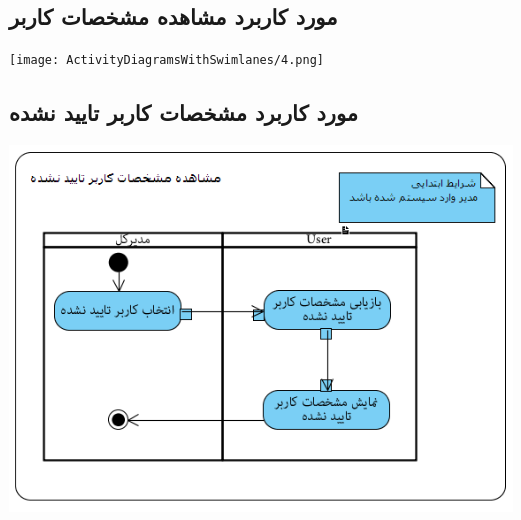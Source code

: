 \newpage
\vspace{2cm}
\subsection*{مورد کاربرد مشاهده مشخصات کاربر}
\vspace{2cm}
\begin{center}
\texttt{[image: ActivityDiagramsWithSwimlanes/4.png]}
\end{center}

\newpage
\vspace{2cm}
\subsection*{مورد کاربرد مشخصات کاربر تایید نشده}
\vspace{2cm}
\begin{center}
\includegraphics[width=\textwidth]{ActivityDiagramsWithSwimlanes/5.png}
\end{center}

\newpage
\vspace{2cm}
